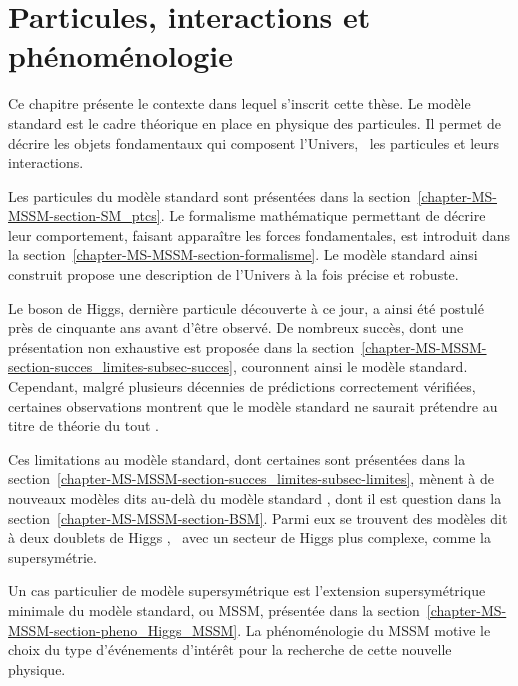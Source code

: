 \chapter{Particules, interactions et phénoménologie}\label{chapter-MS-MSSM}

Ce chapitre présente le contexte dans lequel s'inscrit cette thèse.
Le modèle standard est le cadre théorique en place en physique des particules. Il permet de décrire les objets fondamentaux qui composent l'Univers,
\ie\ les particules et leurs interactions.
\par Les particules du modèle standard sont présentées dans la section~\ref{chapter-MS-MSSM-section-SM_ptcs}.
Le formalisme mathématique permettant de décrire leur comportement, faisant apparaître les forces fondamentales, est introduit dans la section~\ref{chapter-MS-MSSM-section-formalisme}.
Le modèle standard ainsi construit propose une description de l'Univers à la fois précise et robuste.
\par Le boson de Higgs, dernière particule découverte à ce jour, a ainsi été postulé près de cinquante ans avant d'être observé. De nombreux succès, dont une présentation non exhaustive est proposée dans la section~\ref{chapter-MS-MSSM-section-succes_limites-subsec-succes}, couronnent ainsi le modèle standard.
Cependant, malgré plusieurs décennies de prédictions correctement vérifiées, certaines observations montrent que le modèle standard ne saurait prétendre au titre de \og théorie du tout \fg{}.
\par Ces limitations au modèle standard, dont certaines sont présentées dans la section~\ref{chapter-MS-MSSM-section-succes_limites-subsec-limites}, mènent à de nouveaux modèles dits \og au-delà du modèle standard \fg{}, dont il est question dans la section~\ref{chapter-MS-MSSM-section-BSM}. Parmi eux se trouvent des modèles dit \og à deux doublets de Higgs \fg, \ie\ avec un secteur de Higgs plus complexe, comme la supersymétrie.
\par
Un cas particulier de modèle supersymétrique est 
l'extension supersymétrique minimale du modèle standard,
ou MSSM,
présentée dans la section~\ref{chapter-MS-MSSM-section-pheno_Higgs_MSSM}.
La phénoménologie du MSSM motive le choix du type d'événements d'intérêt pour la recherche de cette nouvelle physique.











